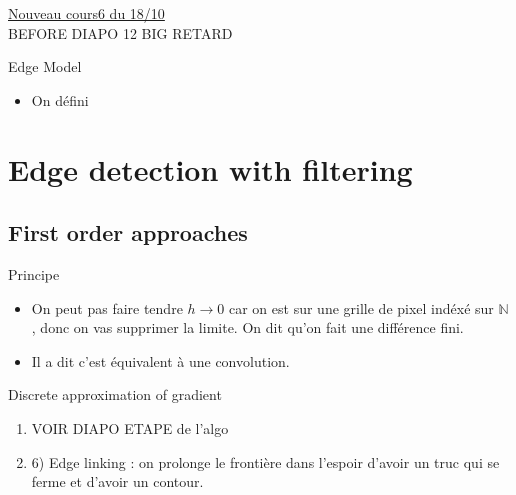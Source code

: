 \documentclass{article}
\theoremstyle{plain}%
\theoremstyle{definition}
\theoremstyle{remark}
\begin{document}
\underline{Nouveau cours6 du 18/10} \\

BEFORE DIAPO 12  BIG RETARD 

Edge Model
\begin{itemize}
    \item On défini 
\end{itemize}

\section{Edge detection with filtering}
\subsection{First order approaches}
Principe 
\begin{itemize}
    \item On peut pas faire tendre $ h \to 0 $ car on est sur une grille de pixel indéxé sur $ \mathbb{N} $, donc on vas supprimer la limite. On dit qu'on fait une différence fini. 
    \item Il a dit c'est équivalent à une convolution. 
\end{itemize}
Discrete approximation of gradient
\begin{enumerate}
    \item VOIR DIAPO ETAPE de l'algo 
    \item 6) Edge linking : on prolonge le frontière dans l'espoir d'avoir un truc qui se ferme et d'avoir un contour. 
\end{enumerate}
\end{document}
